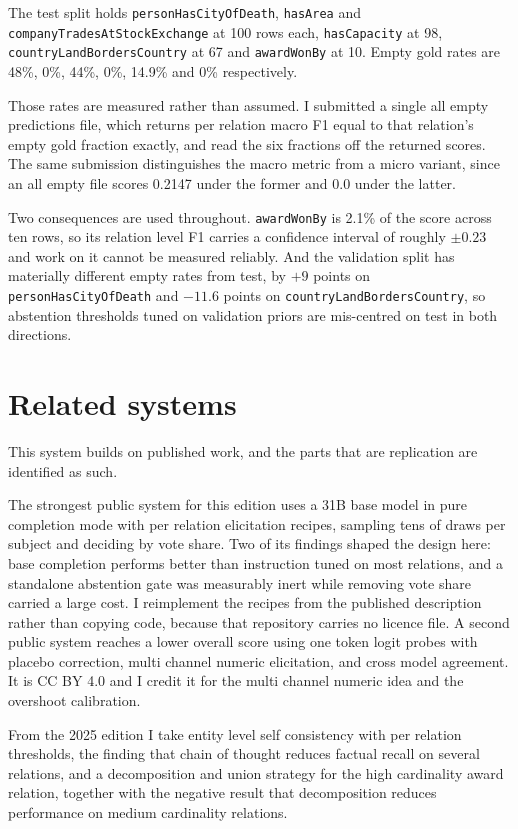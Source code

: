 \documentclass[11pt]{article}
\begin{document}
The test split holds \texttt{personHasCityOfDeath}, \texttt{hasArea} and
\texttt{companyTradesAtStockExchange} at 100 rows each, \texttt{hasCapacity} at
98, \texttt{countryLandBordersCountry} at 67 and \texttt{awardWonBy} at 10. Empty
gold rates are 48\%, 0\%, 44\%, 0\%, 14.9\% and 0\% respectively.

Those rates are measured rather than assumed. I submitted a single all empty
predictions file, which returns per relation macro F1 equal to that relation's
empty gold fraction exactly, and read the six fractions off the returned scores.
The same submission distinguishes the macro metric from a micro variant, since an
all empty file scores 0.2147 under the former and 0.0 under the latter.

Two consequences are used throughout. \texttt{awardWonBy} is 2.1\% of the score
across ten rows, so its relation level F1 carries a confidence interval of
roughly $\pm 0.23$ and work on it cannot be measured reliably. And the validation
split has materially different empty rates from test, by $+9$ points on
\texttt{personHasCityOfDeath} and $-11.6$ points on
\texttt{countryLandBordersCountry}, so abstention thresholds tuned on validation
priors are mis-centred on test in both directions.

\section{Related systems}

This system builds on published work, and the parts that are replication are
identified as such.

The strongest public system for this edition \cite{ruggsea2026} uses a 31B base
model in pure completion mode with per relation elicitation recipes, sampling
tens of draws per subject and deciding by vote share. Two of its findings shaped
the design here: base completion performs better than instruction tuned on most
relations, and a standalone abstention gate was measurably inert while removing
vote share carried a large cost. I reimplement the recipes from the published
description rather than copying code, because that repository carries no licence
file. A second public system \cite{dukesun2026} reaches a lower overall score
using one token logit probes with placebo correction, multi channel numeric
elicitation, and cross model agreement. It is CC BY 4.0 and I credit it for the
multi channel numeric idea and the overshoot calibration.

From the 2025 edition \cite{kalo2025lmkbc,lmkbc2024} I take entity level self
consistency \cite{wang2023selfconsistency} with per relation thresholds, the
finding that chain of thought reduces factual recall on several relations, and a
decomposition and union strategy for the high cardinality award relation,
together with the negative result that decomposition reduces performance on
medium cardinality relations.
\end{document}

